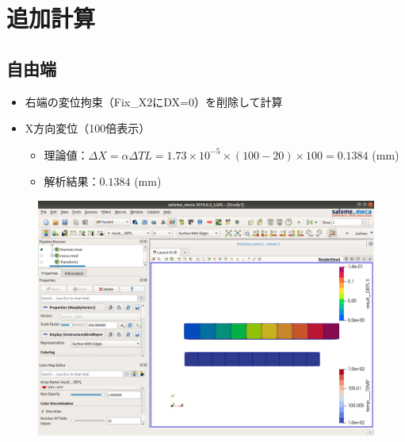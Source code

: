 \section{追加計算}
\subsection{自由端}
\begin{itemize}
	\item 右端の変位拘束（Fix\_X2にDX=0）を削除して計算
	\item X方向変位（100倍表示）
	      \begin{itemize}
		      \item 理論値：$\Delta X=\alpha \Delta T L=1.73\times 10^{-5}\times(100-20)\times 100=0.1384$ (mm)
		      \item 解析結果：$0.1384$ (mm)
	      \end{itemize}
\end{itemize}
\vspace{-\baselineskip}
\begin{figure}[H]
	\centering
	\includegraphics[width=0.65\columnwidth]{fig/Free.png}
\end{figure}